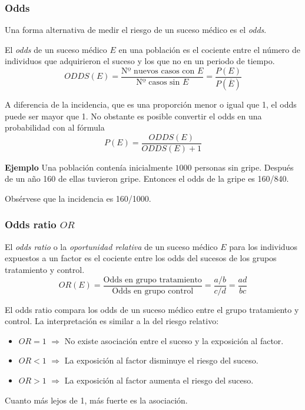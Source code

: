 \begin{frame}
\frametitle{Odds}
Una forma alternativa de medir el riesgo de un suceso médico es el \emph{odds}.

\begin{definicion}[Odie]
El \emph{odds} de un suceso médico $E$ en una población es el cociente entre el número de individuos que adquirieron el suceso y los que no en un periodo de tiempo.
\[
	ODDS(E)=\frac{\mbox{Nº nuevos casos con $E$}}{\mbox{Nº casos sin $E$}}=\frac{P(E)}{P(\overline E)}
\]
\end{definicion}

A diferencia de la incidencia, que es una proporción menor o igual que 1, el odds puede ser mayor que 1.
No obstante es posible convertir el odds en una probabilidad con al fórmula
\[
  P(E) = \frac{ODDS(E)}{ODDS(E)+1}
\]

\textbf{Ejemplo} Una población contenía inicialmente $1000$ personas sin gripe.
Después de un año 160 de ellas tuvieron gripe.
Entonces el odds de la gripe es 160/840.

Obsérvese que la incidencia es 160/1000.
\end{frame}
 

\begin{frame}
\frametitle{Odds ratio $OR$ }
\begin{definicion}
El \emph{odds ratio} o la \emph{oportunidad relativa} de un suceso médico $E$ para los individuos expuestos a un factor es el cociente entre los odds del sucesos de los grupos tratamiento y control.
\[
  OR(E)=\frac{\mbox{Odds en grupo tratamiento}}{\mbox{Odds en grupo control}}=\frac{a/b}{c/d}=\frac{ad}{bc}
\]
\end{definicion}

El odds ratio compara los odds de un suceso médico entre el grupo tratamiento y control.
La interpretación es similar a la del riesgo relativo:
\begin{itemize}
  \item $OR=1$ $\Rightarrow$ No existe asociación entre el suceso y la exposición al factor.
  \item $OR<1$ $\Rightarrow$ La exposición al factor disminuye el riesgo del suceso.
  \item $OR>1$ $\Rightarrow$ La exposición al factor aumenta el riesgo del suceso.
\end{itemize}
Cuanto más lejos de 1, más fuerte es la asociación. 
\end{frame}


